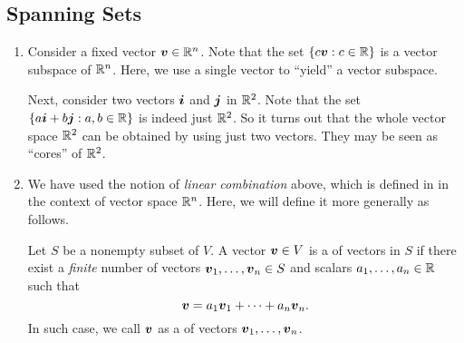 \subsection{Spanning Sets}
\begin{enumerate}
\item Consider a fixed vector \(\vb*{v}\in\mathbb{R}^n\). Note that the set
\(\{c\vb*{v}:c\in\mathbb{R}\}\) is a vector subspace of \(\mathbb{R}^n\). Here, we use a
single vector to ``yield''  a vector subspace.

Next, consider two vectors \(\vb*{i}\) and \(\vb*{j}\) in \(\mathbb{R}^2\). Note that
the set \(\{a\vb*{i}+b\vb*{j}:a,b\in\mathbb{R}\}\) is indeed just \(\mathbb{R}^2\). So it
turns out that the whole vector space \(\mathbb{R}^2\) can be obtained by using just
two vectors. They may be seen as ``cores'' of \(\mathbb{R}^2\).

\item We have used the notion of \emph{linear combination} above, which is
defined in  in the context of vector space \(\mathbb{R}^n\).
Here, we will define it more generally as follows.

Let \(S\) be a nonempty subset of \(V\). A vector \(\vb*{v}\in V\) is a
 of vectors in \(S\) if there exist a \emph{finite}
number of vectors \(\vb*{v}_1,\dotsc,\vb*{v}_{n}\in S\) and scalars
\(a_1,\dotsc,a_n\in\mathbb{R}\) such that
\[
\vb*{v}=a_1\vb*{v}_1+\dotsb+a_n\vb*{v}_n.
\]
In such case, we call \(\vb*{v}\) as a  of vectors
\(\vb*{v}_1,\dotsc,\vb*{v}_n\).


\end{enumerate}
